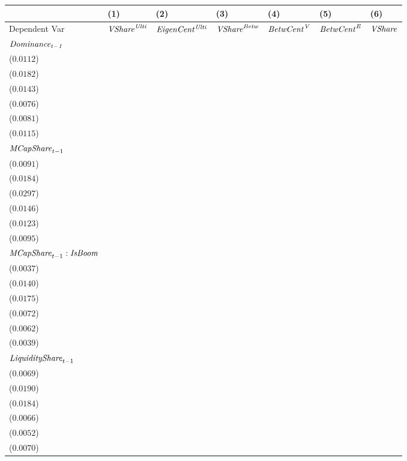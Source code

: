\begin{tabular}{lllllll}
\toprule
 & (1) & (2) & (3) & (4) & (5) & (6) \\
\midrule
Dependent Var & ${\it {VShare}^{\it Ulti}}$ & ${\it EigenCent^{\it Ulti}}$ & ${\it VShare}^{\it Betw}$ & ${\it BetwCent}^{\it V}$ & ${\it BetwCent}^{\it E}$ & ${\it VShare}$ \\
$\it Dominance_{t-1}$ & \makecell{$0.8438^{***}$ \\ ($0.0112$)} & \makecell{$0.7689^{***}$ \\ ($0.0182$)} & \makecell{$0.8601^{***}$ \\ ($0.0143$)} & \makecell{$0.9423^{***}$ \\ ($0.0076$)} & \makecell{$0.9429^{***}$ \\ ($0.0081$)} & \makecell{$0.8440^{***}$ \\ ($0.0115$)} \\
${\it MCapShare}_{t-1}$ & \makecell{$0.0269^{***}$ \\ ($0.0091$)} & \makecell{$0.0341^{*}$ \\ ($0.0184$)} & \makecell{$0.0054^{}$ \\ ($0.0297$)} & \makecell{$0.0304^{**}$ \\ ($0.0146$)} & \makecell{$0.0354^{***}$ \\ ($0.0123$)} & \makecell{$0.0202^{**}$ \\ ($0.0095$)} \\
${\it MCapShare}_{t-1}:{\it IsBoom}$ & \makecell{$0.0048^{}$ \\ ($0.0037$)} & \makecell{$-0.0100^{}$ \\ ($0.0140$)} & \makecell{$0.0622^{***}$ \\ ($0.0175$)} & \makecell{$0.0197^{***}$ \\ ($0.0072$)} & \makecell{$0.0092^{}$ \\ ($0.0062$)} & \makecell{$0.0122^{***}$ \\ ($0.0039$)} \\
${\it LiquidityShare}_{t-1}$ & \makecell{$0.0365^{***}$ \\ ($0.0069$)} & \makecell{$0.0409^{**}$ \\ ($0.0190$)} & \makecell{$0.1181^{***}$ \\ ($0.0184$)} & \makecell{$0.0209^{***}$ \\ ($0.0066$)} & \makecell{$0.0182^{***}$ \\ ($0.0052$)} & \makecell{$0.0441^{***}$ \\ ($0.0070$)} \\

\end{tabular}
